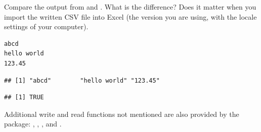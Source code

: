 \documentclass[krantz2]{krantz}\usepackage{knitr}%
\begin{document}
\begin{playground}
Compare the output from  and . What is the difference? Does it matter when you import the written CSV file into Excel (the version you are using, with the locale settings of your computer).
\end{playground}

\begin{knitrout}\footnotesize
{}\color{fgcolor}\begin{kframe}
\begin{alltt}
  \hlstd{=} \hlstd{)}
\hlstd{(}\hlstd{,}  \hlstd{=} \hlstd{)}
\end{alltt}
\end{kframe}
\end{knitrout}

\begin{knitrout}\footnotesize
{}\color{fgcolor}\begin{kframe}
\begin{verbatim}
abcd
hello world
123.45
\end{verbatim}
\end{kframe}
\end{knitrout}

\begin{knitrout}\footnotesize
{}\color{fgcolor}\begin{kframe}
\begin{alltt}
 \hlkwb{<-} \hlstd{(}\hlstd{)}
\end{alltt}
\begin{verbatim}
## [1] "abcd"        "hello world" "123.45"
\end{verbatim}
\begin{alltt}
  \hlstd{=} \hlstd{)}
\end{alltt}
\begin{verbatim}
## [1] TRUE
\end{verbatim}
\end{kframe}
\end{knitrout}

Additional write and read functions not mentioned are also provided by the package: , , , and .
\end{document}
